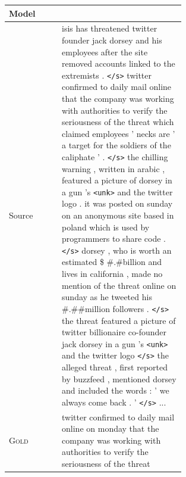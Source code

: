 \documentclass[12pt]{report}
\begin{document}
\begin{figure}[p]
\centering
\begin{tabular}{ll p{0.7\linewidth}}
\toprule
Model & & \\
\midrule
Source & & isis has threatened twitter founder jack dorsey and his employees after the site removed accounts linked to the extremists . \texttt{</s>} twitter confirmed to daily mail online that the company was working with authorities to verify the seriousness of the threat which claimed employees ' necks are ' a target for the soldiers of the caliphate ' . \texttt{</s>} the chilling warning , written in arabic , featured a picture of dorsey in a gun 's \texttt{<unk>} and the twitter logo . it was posted on sunday on an anonymous site based in poland which is used by programmers to share code . \texttt{</s>} dorsey , who is worth an estimated \$ \#.\#billion and lives in california , made no mention of the threat online on sunday as he tweeted his \#.\#\#million followers . \texttt{</s>} the threat featured a picture of twitter billionaire co-founder jack dorsey in a gun 's \texttt{<unk>} and the twitter logo \texttt{</s>} the alleged threat , first reported by buzzfeed , mentioned dorsey and included the words : ' we always come back . ' \texttt{</s>} ... \\
\midrule
\textsc{Gold} & & twitter confirmed to daily mail online on monday that the company was working with authorities to verify the seriousness of the threat \\

\end{tabular}
\end{figure}
\end{document}
